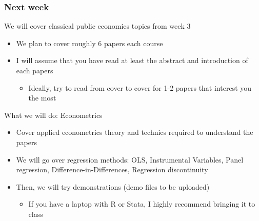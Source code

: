 \documentclass[aspectratio=169]{beamer}
\begin{document}
\begin{frame}
\frametitle{Next week} 
 We will cover classical public economics topics from week 3
\begin{itemize}\setlength\itemsep{3pt}
\item We plan to cover roughly 6 papers each course
\item I will assume that you have read at least the abstract and introduction of each papers
\begin{itemize}
  \item Ideally, try to read from cover to cover for 1-2 papers that interest you the most
\end{itemize}
\end{itemize} \medskip
What we will do: Econometrics 
\begin{itemize}\setlength\itemsep{3pt}
\item Cover applied econometrics theory and technics required to understand the papers
\item We will go over regression methods: OLS, Instrumental Variables, Panel regression, Difference-in-Differences, Regression discontinuity
\item Then, we will try demonstrations (demo files to be uploaded)
\begin{itemize}
  \item  If you have a laptop with R or Stata, I highly recommend bringing it to class
\end{itemize}
\end{itemize} \medskip
\end{frame}


\end{document}
